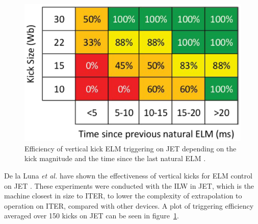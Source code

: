 \documentclass[11pt, twocolumn]{article}  %
\begin{document}
\begin{figure}
\includegraphics[scale=0.43]{Figures/VKELMprob.png}
\centering
\caption{Efficiency of vertical kick ELM triggering on JET depending on the kick magnitude and the time since the last natural ELM \cite{Chapman2016}.}\label{fig:VKELMprob}
\end{figure}

De la Luna \textit{et al.} have shown the effectiveness of vertical kicks for ELM control on JET \cite{DelaLuna2016}. These experiments were conducted with the ILW in JET, which is the machine closest in size to ITER, to lower the complexity of extrapolation to operation on ITER, compared with other devices. A plot of triggering efficiency averaged over 150 kicks on JET can be seen in figure~\ref{fig:VKELMprob}.
\end{document}
